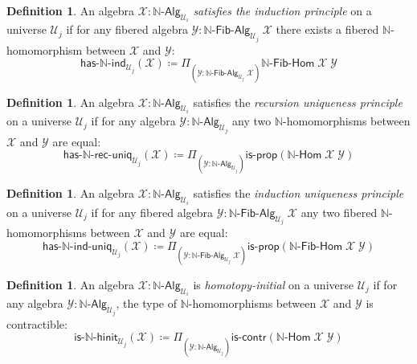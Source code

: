 \documentclass[11pt]{article}
\newcommand{\X}{\mathcal{X}}
\newcommand{\Y}{\mathcal{Y}}
\newcommand{\prd}[1]{\Pi_{#1}}
\newcommand{\defeq}{\coloneqq}
\newcommand{\nat}{\ensuremath{\mathbb{N}}}
\newcommand{\UU}{\mathcal{U}}
\newcommand{\NatAlg}{\nat\text{-}\mathsf{Alg}}
\newcommand{\NatHom}{\nat\text{-}\mathsf{Hom}}
\newcommand{\HasNatInd}{\mathsf{has}\text{-}\nat\text{-}\mathsf{ind}}
\newcommand{\HasNatRecUniq}{\mathsf{has}\text{-}\nat\text{-}\mathsf{rec}\text{-}\mathsf{uniq}}
\newcommand{\HasNatIndUniq}{\mathsf{has}\text{-}\nat\text{-}\mathsf{ind}\text{-}\mathsf{uniq}}
\newcommand{\NatFibAlg}{\nat\text{-}\mathsf{Fib}\text{-}\mathsf{Alg}}
\newcommand{\NatFibHom}{\nat\text{-}\mathsf{Fib}\text{-}\mathsf{Hom}}
\newcommand{\IsNatHInit}{\mathsf{is}\text{-}\nat\text{-}\mathsf{hinit}}
\newcommand{\iscontr}{\mathsf{is}\text{-}\mathsf{contr}}
\newcommand{\isprop}{\mathsf{is}\text{-}\mathsf{prop}}
\theoremstyle{definition}
\newtheorem{definition}[theorem]{Definition}
\begin{document}
\begin{definition}\label{def:NatInd}
An algebra $\mathcal{X} : \NatAlg_{\UU_i}$ \emph{satisfies the induction principle} on a universe $\UU_j$ if for any 
fibered algebra $\Y : \NatFibAlg_{\UU_j} \; \X$ there exists a fibered $\nat$-homomorphism between $\X$ and $\Y$:
\[\HasNatInd_{\UU_j}(\X) \defeq \prd{(\Y:\NatFibAlg_{\UU_j} \; \X)} \NatFibHom \; \X \; \Y\] 
\end{definition}

\begin{definition}\label{def:NatRecUniq}
An algebra $\X : \NatAlg_{\UU_i}$ satisfies the \emph{recursion uniqueness principle} on a universe $\UU_j$ if for any algebra $\Y : \NatAlg_{\UU_j}$ any two $\nat$-homomorphisms between $\X$ and $\Y$ are equal:
\[ \HasNatRecUniq_{\UU_j}(\X) \defeq \prd{(\Y:\NatAlg_{\UU_j})} \isprop(\NatHom \; \X \; \Y)\]
\end{definition}

\begin{definition}\label{def:NatIndUniq}
An algebra $\X : \NatAlg_{\UU_i}$ satisfies the \emph{induction uniqueness principle} on a universe $\UU_j$ if for any fibered algebra $\Y : \NatFibAlg_{\UU_j}\;\X$ any two fibered $\nat$-homomorphisms between $\X$ and $\Y$ are equal:
\[ \HasNatIndUniq_{\UU_j}(\X) \defeq \prd{(\Y:\NatFibAlg_{\UU_j} \; \X)} \isprop(\NatFibHom \; \X \; \Y)\]
\end{definition}

\begin{definition}\label{def:NatInit}
An algebra $\X : \NatAlg_{\UU_i}$ is \emph{homotopy-initial} on a universe $\UU_j$ if for any algebra $\Y : \NatAlg_{\UU_j}$, the type of $\nat$-homomorphisms between $\X$ and $\Y$ is contractible:
\[ \IsNatHInit_{\UU_j}(\X) \defeq \prd{(\Y:\NatAlg_{\UU_j})} \iscontr(\NatHom \; \X \; \Y) \]  
\end{definition}
\end{document}
